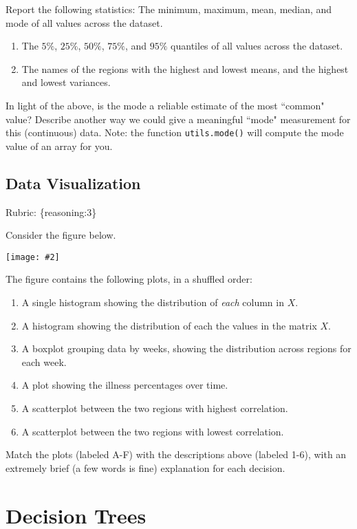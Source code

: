 \documentclass{article}
\def\blu#1{{\color{blu}#1}}
\def\gre#1{{\color{gre}#1}}
\newcommand{\fig}[2]{\texttt{[image: \#2]}}
\def\enum#1{\begin{enumerate}#1\end{enumerate}}
\def\rubric#1{\gre{Rubric: \{#1\}}}{}
\begin{document}
\blu{Report the following statistics}:
The minimum, maximum, mean, median, and mode of all values across the dataset.
\enum{
\item The $5\%$, $25\%$, $50\%$, $75\%$, and $95\%$ quantiles of all values across the dataset.
\item The names of the regions with the highest and lowest means, and the highest and lowest variances.
}
In light of the above, \blu{is the mode a reliable estimate of the most ``common" value? Describe another way we could give a meaningful ``mode" measurement for this (continuous) data.} Note: the function \texttt{utils.mode()} will compute the mode value of an array for you.


\subsection{Data Visualization}
\rubric{reasoning:3}

Consider the figure below.

\fig{1}{../figs/q12visualize-unlabeled}

The figure contains the following plots, in a shuffled order:
\enum{
\item A single histogram showing the distribution of \emph{each} column in $X$.
\item A histogram showing the distribution of each the values in the matrix $X$.
\item A boxplot grouping data by weeks, showing the distribution across regions for each week.
\item A plot showing the illness percentages over time.
\item A scatterplot between the two regions with highest correlation.
\item A scatterplot between the two regions with lowest correlation.
}

\blu{Match the plots (labeled A-F) with the descriptions above (labeled 1-6), with an extremely brief (a few words is fine) explanation for each decision.}





\section{Decision Trees}
\end{document}
